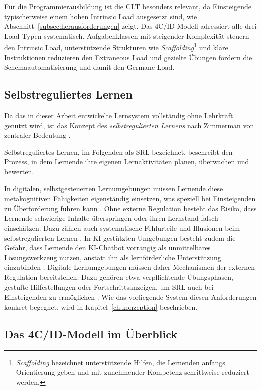 Für die Programmierausbildung ist die CLT besonders relevant, da Einsteigende typischerweise einem hohen Intrinsic Load ausgesetzt sind, wie Abschnitt~\ref{subsec:herausforderungen} zeigt. Das 4C/ID-Modell adressiert alle drei Load-Typen systematisch. Aufgabenklassen mit steigender Komplexität steuern den Intrinsic Load, unterstützende Strukturen wie \textit{Scaffolding}\footnote{\textit{Scaffolding} bezeichnet unterstützende Hilfen, die Lernenden anfangs Orientierung geben und mit zunehmender Kompetenz schrittweise reduziert werden.} und klare Instruktionen reduzieren den Extraneous Load und gezielte Übungen fördern die Schemaautomatisierung und damit den Germane Load.

\clearpage
\subsection{Selbstreguliertes Lernen}\label{subsec:srl}

Da das in dieser Arbeit entwickelte Lernsystem vollständig ohne Lehrkraft genutzt wird, ist das Konzept des \textit{selbstregulierten Lernens} nach Zimmerman von zentraler Bedeutung \cite{zimmerman2002, panadero2017, winne2005}. 

Selbstreguliertes Lernen, im Folgenden als SRL bezeichnet, beschreibt den Prozess, in dem Lernende ihre eigenen Lernaktivitäten planen, überwachen und bewerten.

In digitalen, selbstgesteuerten Lernumgebungen müssen Lernende diese metakognitiven Fähig\-keiten eigenständig einsetzen, was speziell bei Einsteigenden zu Überforderung führen kann \cite{winne2005}.
Ohne externe Regulation besteht das Risiko, dass Lernende schwierige Inhalte überspringen oder ihren Lernstand falsch einschätzen. Dazu zählen auch systematische Fehlurteile und Illusionen beim selbstregulierten Lernen \cite{bjork2013}.
In KI-gestützten Umgebungen besteht zudem die Gefahr, dass Lernende den KI-Chatbot vorrangig als unmittelbares Lösungs\-werkzeug nutzen, anstatt ihn als lernförderliche Unterstützung einzubinden \cite{kazemitabaar2023}.
Digitale Lernumgebungen müssen daher Mechanismen der externen Regulation bereitstellen. Dazu gehören etwa verpflichtende Übungsphasen, gestufte Hilfestellungen oder Fortschrittsanzeigen, um SRL auch bei Einsteigenden zu ermöglichen \cite{azevedo2005}. Wie das vorliegende System diesen Anforderungen konkret begegnet, wird in Kapitel~\ref{ch:konzeption} beschrieben.


\subsection{Das 4C/ID-Modell im Überblick}\label{subsec:4cid-ueberblick}

